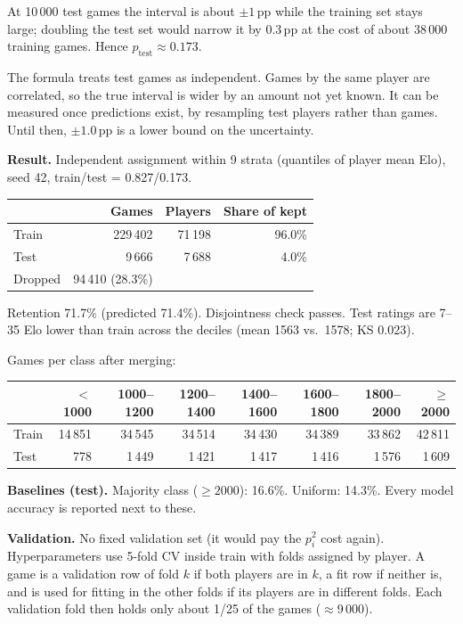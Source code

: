 \documentclass[11pt,a4paper]{article}
\begin{document}
At 10\,000 test
games the interval is about $\pm 1$\,pp while the training set stays large;
doubling the test set would narrow it by 0.3\,pp at the cost of about 38\,000
training games. Hence $p_\text{test} \approx 0.173$.

The formula treats test games as independent. Games by the same player are
correlated, so the true interval is wider by an amount not yet known. It can be
measured once predictions exist, by resampling test players rather than games.
Until then, $\pm 1.0$\,pp is a lower bound on the uncertainty.

\textbf{Result.} Independent assignment within 9 strata (quantiles of player
mean Elo), seed 42, train/test = 0.827/0.173.

\begin{center}
\begin{tabular}{lrrr}
\toprule
 & Games & Players & Share of kept \\
\midrule
Train & 229\,402 & 71\,198 & 96.0\% \\
Test  &   9\,666 &  7\,688 &  4.0\% \\
\midrule
Dropped & 94\,410 (28.3\%) & & \\
\bottomrule
\end{tabular}
\end{center}

Retention 71.7\% (predicted 71.4\%). Disjointness check passes. Test ratings are
7--35 Elo lower than train across the deciles (mean 1563 vs.\ 1578; KS 0.023).

Games per class after merging:
\begin{center}
\begin{tabular}{lrrrrrrr}
\toprule
 & $<$1000 & 1000--1200 & 1200--1400 & 1400--1600 & 1600--1800 & 1800--2000 & $\ge$2000 \\
\midrule
Train & 14\,851 & 34\,545 & 34\,514 & 34\,430 & 34\,389 & 33\,862 & 42\,811 \\
Test  & 778 & 1\,449 & 1\,421 & 1\,417 & 1\,416 & 1\,576 & 1\,609 \\
\bottomrule
\end{tabular}
\end{center}

\textbf{Baselines (test).} Majority class ($\ge 2000$): 16.6\%. Uniform: 14.3\%.
Every model accuracy is reported next to these.

\textbf{Validation.} No fixed validation set (it would pay the $p_i^2$ cost again).
Hyperparameters use 5-fold CV inside train with folds assigned by player. A game
is a validation row of fold $k$ if both players are in $k$, a fit row if neither
is, and is used for fitting in the other folds if its players are in different
folds. Each validation fold then holds only about 1/25 of the games ($\approx$9\,000).
\end{document}
